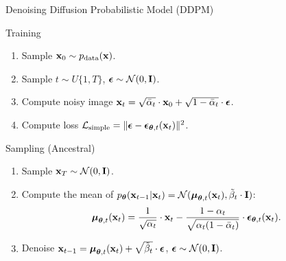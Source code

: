 \documentclass{beamer}
\renewcommand{\eqpause}{}
\begin{document}
\begin{frame}{Denoising Diffusion Probabilistic Model (DDPM)}
    \begin{block}{Training}
        \begin{enumerate}
            \item Sample $\mathbf{x}_0 \sim p_{\text{data}}(\mathbf{x})$.
            \item Sample $t \sim U\{1, T\}$, $\boldsymbol{\epsilon} \sim \mathcal{N}(0, \mathbf{I})$.
            \item Compute noisy image $\mathbf{x}_t = \sqrt{\bar{\alpha}_t} \cdot \mathbf{x}_0 + \sqrt{1 - \bar{\alpha}_t} \cdot \boldsymbol{\epsilon}$.
            \item Compute loss $ \mathcal{L}_{\text{simple}} = \| \boldsymbol{\epsilon} - \boldsymbol{\epsilon}_{\boldsymbol{\theta}, t}(\mathbf{x}_t) \|^2 $.
        \end{enumerate}
    \end{block}
    \eqpause
    \begin{block}{Sampling (Ancestral)}
        \begin{enumerate}
            \item Sample $\mathbf{x}_T \sim \mathcal{N}(0, \mathbf{I})$.
            \item Compute the mean of $p_{\boldsymbol{\theta}}(\mathbf{x}_{t-1} | \mathbf{x}_t) = \mathcal{N}(\boldsymbol{\mu}_{\boldsymbol{\theta}, t}(\mathbf{x}_t), \tilde{\beta}_t \cdot \mathbf{I})$:
            \vspace{-0.3cm}
            \[
                \boldsymbol{\mu}_{\boldsymbol{\theta}, t}(\mathbf{x}_t) = \frac{1}{\sqrt{\alpha_t}} \cdot \mathbf{x}_t - \frac{1 - \alpha_t}{\sqrt{\alpha_t (1 - \bar{\alpha}_t)}} \cdot \boldsymbol{\epsilon}_{\boldsymbol{\theta}, t}(\mathbf{x}_t).
            \]
            \vspace{-0.5cm}
            \item Denoise $\mathbf{x}_{t - 1} = \boldsymbol{\mu}_{\boldsymbol{\theta}, t}(\mathbf{x}_t) +  \sqrt{\tilde{\beta}_t} \cdot \boldsymbol{\epsilon}$, $\boldsymbol{\epsilon} \sim \mathcal{N}(0, \mathbf{I})$.
        \end{enumerate}
    \end{block}
\end{frame}
\end{document}

